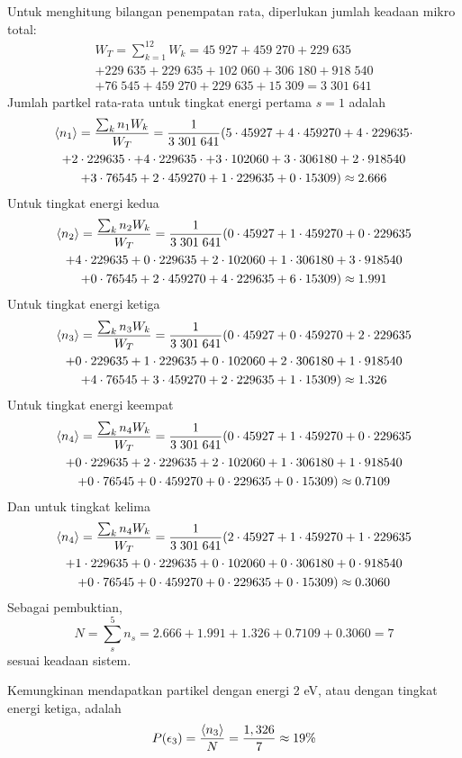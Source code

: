 \documentclass[../../../Main.tex]{subfiles}
\begin{document}
Untuk menghitung bilangan penempatan rata, diperlukan jumlah keadaan mikro total:
\begin{multline*}
    W_T=\sum_{k=1}^{12} W_k= 45\;927+ 459\;270+ 229\;635 \\
    + 229\;635 + 229\;635 + 102\;060 + 306\;180+ 918\;540\\
    + 76\;545+459\;270+ 229\;635+ 15\;309= 3\;301\;641
\end{multline*}
Jumlah partkel rata-rata untuk tingkat energi pertama $s=1$ adalah 
\begin{multline*}
    \braket{n_1}=\frac{\sum_k n_1W_k}{W_T}=\frac{1}{3\;301\;641}( 5\cdot45927+4\cdot459270+4\cdot229635\cdot\\
    +2\cdot229635\cdot+4\cdot229635\cdot+3\cdot102060+3\cdot306180+2\cdot918540\\+3\cdot76545
    +2\cdot459270+1\cdot229635+0\cdot15309)\approx2.666
\end{multline*}
Untuk tingkat energi kedua
\begin{multline*}
    \braket{n_2}=\frac{\sum_k n_2W_k}{W_T}=\frac{1}{3\;301\;641}(0\cdot45927 + 1\cdot459270 + 0\cdot229635 \\
    + 4\cdot229635 + 0\cdot229635 + 2\cdot102060 + 1\cdot306180 + 3\cdot918540\\ + 0\cdot76545
     + 2\cdot459270 + 4\cdot229635 + 6\cdot15309)\approx 1.991
\end{multline*}
Untuk tingkat energi ketiga
\begin{multline*}
    \braket{n_3}=\frac{\sum_k n_3W_k}{W_T}=\frac{1}{3\;301\;641} (0\cdot45927 + 0\cdot459270 + 2\cdot229635 \\
    + 0\cdot229635 + 1\cdot229635 + 0\cdot102060 + 2\cdot306180 + 1\cdot918540 \\
    + 4\cdot76545 + 3\cdot459270 + 2\cdot229635 + 1\cdot15309)\approx1.326
\end{multline*}
Untuk tingkat energi keempat
\begin{multline*}
    \braket{n_4}=\frac{\sum_k n_4W_k}{W_T}=\frac{1}{3\;301\;641}  (0\cdot45927 + 1\cdot459270 + 0\cdot229635 \\
    + 0\cdot229635 + 2\cdot229635 + 2\cdot102060 + 1\cdot306180 + 1\cdot918540 \\
    + 0\cdot76545 + 0\cdot459270 + 0\cdot229635 + 0\cdot15309)\approx 0.7109
\end{multline*}
Dan untuk tingkat kelima
\begin{multline*}
    \braket{n_4}=\frac{\sum_k n_4W_k}{W_T}=\frac{1}{3\;301\;641}  (2\cdot45927 + 1\cdot459270 + 1\cdot229635 \\
    + 1\cdot229635 + 0\cdot229635 + 0\cdot102060 + 0\cdot306180 + 0\cdot918540 \\
    + 0\cdot76545 + 0\cdot459270 + 0\cdot229635 + 0\cdot15309)\approx 0.3060
\end{multline*}
Sebagai pembuktian,
\begin{equation*}
    N=\sum_s^5n_s=2.666+ 1.991+1.326+ 0.7109+0.3060=7
\end{equation*}
sesuai keadaan sistem.

Kemungkinan mendapatkan partikel dengan energi 2 eV, atau dengan tingkat energi ketiga, adalah
\begin{equation*}
    P(\epsilon_3)=\frac{\braket{n_3}}{N}=\frac{1,326}{7}\approx19\%
\end{equation*}
\end{document}
